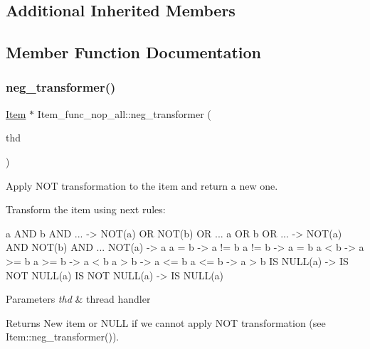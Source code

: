 \subsection*{Additional Inherited Members}


\subsection{Member Function Documentation}
\mbox{\label{classItem__func__nop__all_a6584dde63d69111ad332417b07883229}} 
\subsubsection{\texorpdfstring{neg\+\_\+transformer()}{neg\_transformer()}}
{\footnotesize\ttfamily \mbox{\hyperlink{classItem}{Item}} $\ast$ Item\+\_\+func\+\_\+nop\+\_\+all\+::neg\+\_\+transformer (\begin{DoxyParamCaption}\item[{T\+HD $\ast$}]{thd }\end{DoxyParamCaption})\hspace{0.3cm}{\ttfamily [virtual]}}

Apply N\+OT transformation to the item and return a new one.

Transform the item using next rules\+: \begin{DoxyVerb}     a AND b AND ...    -> NOT(a) OR NOT(b) OR ...
     a OR b OR ...      -> NOT(a) AND NOT(b) AND ...
     NOT(a)             -> a
     a = b              -> a != b
     a != b             -> a = b
     a < b              -> a >= b
     a >= b             -> a < b
     a > b              -> a <= b
     a <= b             -> a > b
     IS NULL(a)         -> IS NOT NULL(a)
     IS NOT NULL(a)     -> IS NULL(a)\end{DoxyVerb}



\begin{DoxyParams}{Parameters}
{\em thd} & thread handler\\
\hline
\end{DoxyParams}
\begin{DoxyReturn}{Returns}
New item or N\+U\+LL if we cannot apply N\+OT transformation (see Item\+::neg\+\_\+transformer()). 
\end{DoxyReturn}


